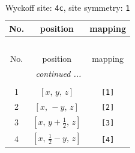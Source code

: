 \documentclass[fleqn,8pt]{jsarticle}
\begin{document}
\begin{longtable}{ccc}
\caption{Wyckoff site: {\tt 4c}, site symmetry: {\tt 1}}
 \\
 \hline \hline
No. & position & mapping \\ \hline \endfirsthead

\multicolumn{2}{l}{\tablename\ \thetable{}} \\
 \hline \hline
No. & position & mapping \\ \hline \endhead

 \hline \hline
\multicolumn{2}{r}{\footnotesize\it continued ...} \\ \endfoot

 \hline \hline
\multicolumn{2}{r}{} \\ \endlastfoot

1 & $\left[ x,\, y,\, z \right]$ & {\tt [1]} \\ \hline
2 & $\left[ x,\, - y,\, z \right]$ & {\tt [2]} \\ \hline
3 & $\left[ x,\, y + \frac{1}{2},\, z \right]$ & {\tt [3]} \\ \hline
4 & $\left[ x,\, \frac{1}{2} - y,\, z \right]$ & {\tt [4]} \\
\end{longtable}
\end{document}
